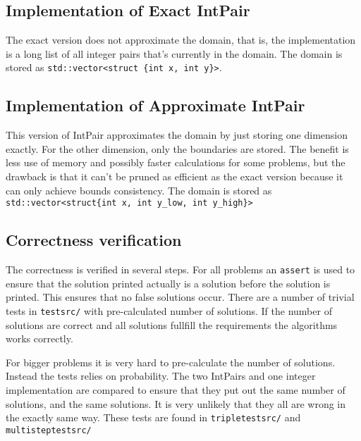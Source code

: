 \documentclass[a4paper,11pt]{article}
\begin{document}
\subsection{Implementation of Exact IntPair}
The exact version does not approximate the domain, that is, the implementation is a long list of all integer pairs that's currently in the domain. The domain is stored as \texttt{std::vector<struct \{int x, int y\}>}. 

\subsection{Implementation of Approximate IntPair}
This version of IntPair approximates the domain by just storing one dimension exactly. For the other dimension, only the boundaries are stored. The benefit is less use of memory and possibly faster calculations for some problems, but the drawback is that it can't be pruned as efficient as the exact version because it can only achieve bounds consistency. The domain is stored as \texttt{std::vector<struct\{int x, int y\_low, int y\_high\}>}

\subsection{Correctness verification}
The correctness is verified in several steps. For all problems an \texttt{assert} is used to ensure that the solution printed actually is a solution before the solution is printed. This ensures that no false solutions occur. There are a number of trivial tests in \texttt{testsrc/} with pre-calculated number of solutions. If the number of solutions are correct and all solutions fullfill the requirements the algorithms works correctly.

For bigger problems it is very hard to pre-calculate the number of solutions. Instead the tests relies on probability. The two IntPairs and one integer implementation are compared to ensure that they put out the same number of solutions, and the same solutions. It is very unlikely that they all are wrong in the exactly same way. These tests are found in \texttt{tripletestsrc/} and \texttt{multisteptestsrc/}
\end{document}
